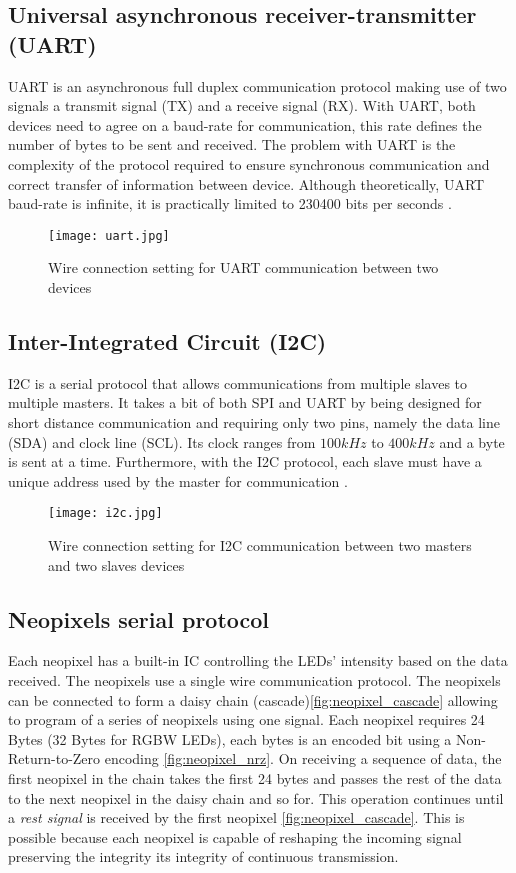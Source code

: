 \subsection{Universal asynchronous receiver-transmitter (UART)}
UART is an asynchronous full duplex communication protocol making use of two signals a transmit signal (TX) and a receive signal (RX). With UART, both devices need to agree on a baud-rate for communication, this rate defines the number of bytes to be sent and received. The problem with UART is the complexity of the protocol required to ensure synchronous communication and correct transfer of information between device. Although theoretically, UART baud-rate is infinite, it is practically limited to 230400 bits per seconds \cite{uart}.   
\begin{figure}[h!]
\centering
\texttt{[image: uart.jpg]}
\caption{Wire connection setting for UART communication between two devices}
\label{fig:uart_coms}
\end{figure}
\subsection{Inter-Integrated Circuit (I2C)}
I2C is a serial protocol that allows communications from multiple slaves to multiple masters. It takes a bit of both SPI and UART by being designed for short distance communication and requiring only two pins, namely the data line (SDA) and clock line (SCL). Its clock ranges from $100kHz$ to $400kHz$ and a byte is sent at a time. Furthermore, with the I2C protocol, each slave must have a unique address used by the master for communication \cite{i2c}.  
\begin{figure}[h!]
\centering
\texttt{[image: i2c.jpg]}
\caption{Wire connection setting for I2C communication between two masters and two slaves devices}
\label{fig:i2c_coms}
\end{figure}
\subsection{Neopixels serial protocol}
Each neopixel has a built-in IC controlling the LEDs' intensity based on the data received. The neopixels use a single wire communication protocol. The neopixels can be connected to form a daisy chain (cascade)\cref{fig:neopixel_cascade} allowing to program of a series of neopixels using one signal. Each neopixel requires 24 Bytes (32 Bytes for RGBW LEDs), each bytes is an encoded bit using a Non-Return-to-Zero encoding \cref{fig:neopixel_nrz}. On receiving a sequence of data, the first neopixel in the chain takes the first 24 bytes and passes the rest of the data to the next neopixel in the daisy chain and so for. This operation continues until a \textit{rest signal} is received by the first neopixel \cref{fig:neopixel_cascade}. This is possible because each neopixel is capable of reshaping the incoming signal preserving the integrity its integrity of continuous transmission.


